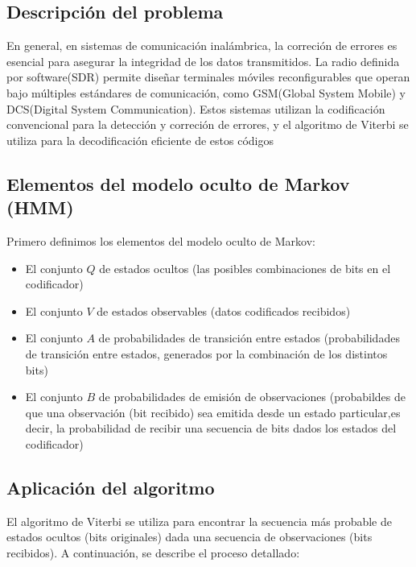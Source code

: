 \documentclass[11pt,openany]{book}
\begin{document}
\subsection*{Descripción del problema}
En general, en sistemas de comunicación inalámbrica, la correción de errores es 
esencial para asegurar la integridad de los datos transmitidos. La radio definida
por software(SDR) permite diseñar terminales móviles reconfigurables que
operan  bajo múltiples estándares de comunicación, como GSM(Global System Mobile) y 
DCS(Digital System Communication). Estos sistemas utilizan la codificación
convencional para la detección y correción de errores, y el algoritmo de  
Viterbi se utiliza para la decodificación eficiente de estos códigos

\subsection*{Elementos del modelo oculto de Markov (HMM)}

Primero definimos los elementos del modelo oculto de Markov:
\begin{itemize}
      \item El conjunto $Q$ de estados ocultos (las posibles combinaciones de bits en el codificador)
      \item El conjunto $V$ de estados observables (datos codificados recibidos)
      \item El conjunto $A$ de probabilidades de transición entre estados (probabilidades de transición entre estados, generados por la combinación de los distintos bits)
      \item El conjunto $B$ de probabilidades de emisión de observaciones (probabildes 
      de que una observación (bit recibido) sea emitida desde un estado particular,es decir, la 
      probabilidad de recibir una secuencia de bits dados los estados del codificador)
      
\end{itemize}

\subsection*{Aplicación del algoritmo}
El algoritmo de Viterbi se utiliza para encontrar la secuencia más probable de 
estados ocultos (bits originales) dada una secuencia de observaciones (bits 
recibidos). A continuación, se describe el proceso detallado:
\end{document}
